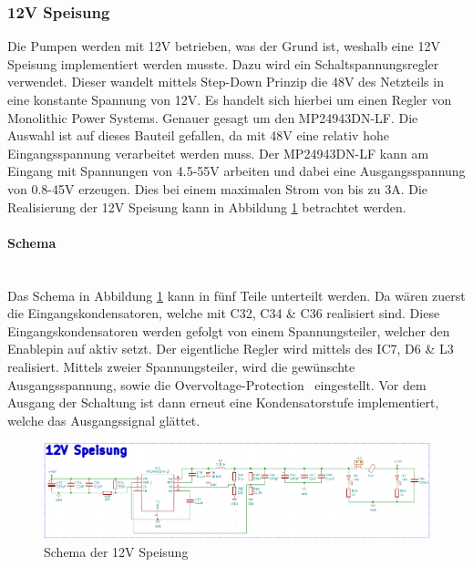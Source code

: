 \subsubsection{12V Speisung}
\label{subsubsec:12V Speisung}

Die Pumpen werden mit 12V betrieben, was der Grund ist, weshalb eine 12V Speisung implementiert werden musste. Dazu wird ein Schaltspannungsregler verwendet. Dieser wandelt mittels Step-Down Prinzip die 48V des Netzteils in eine konstante Spannung von 12V. Es handelt sich hierbei um einen Regler von Monolithic Power Systems. Genauer gesagt um den MP24943DN-LF. Die Auswahl ist auf dieses Bauteil gefallen, da mit 48V eine relativ hohe Eingangsspannung verarbeitet werden muss. Der MP24943DN-LF kann am Eingang mit Spannungen von 4.5-55V arbeiten und dabei eine Ausgangsspannung von 0.8-45V erzeugen. Dies bei einem maximalen Strom von bis zu 3A. Die Realisierung der 12V Speisung kann in Abbildung \ref{fig:Schema_Speisung_12V} betrachtet werden. \cite{aiyimaindustrial_store_us_nodate} \cite{mouser_mp24943dn-lf_nodate} \cite[S.355-370]{atmel_atmel_2014} \\


\paragraph{Schema}\mbox{}\\

Das Schema in Abbildung \ref{fig:Schema_Speisung_12V} kann in fünf Teile unterteilt werden. Da wären zuerst die Eingangskondensatoren, welche mit C32, C34 \& C36 realisiert sind. Diese Eingangskondensatoren werden gefolgt von einem Spannungsteiler, welcher den Enablepin auf aktiv setzt. Der eigentliche Regler wird mittels des IC7, D6 \& L3 realisiert. Mittels zweier Spannungsteiler, wird die gewünschte Ausgangsspannung, sowie die \flqq Overvoltage-Protection\frqq~ eingestellt. Vor dem Ausgang der Schaltung ist dann erneut eine Kondensatorstufe implementiert, welche das Ausgangssignal glättet. \cite{mouser_mp24943dn-lf_nodate}

\begin{figure}[h!]
	\centering
	\includegraphics[width=\textwidth]{graphics/Schema_Speisung_12V.png}
	\caption{Schema der 12V Speisung}
	\label{fig:Schema_Speisung_12V}
\end{figure} 

